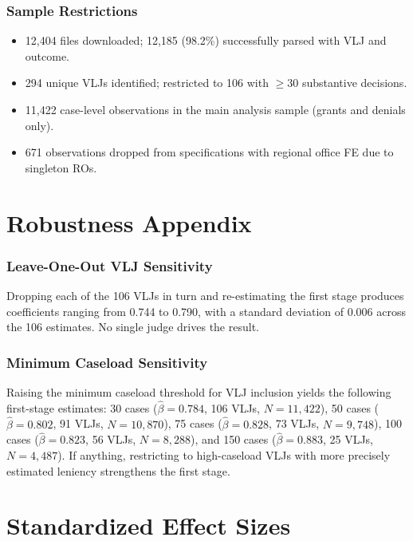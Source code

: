 \documentclass[12pt]{article}
\begin{document}
\subsubsection*{Sample Restrictions}
\begin{itemize}
\item 12,404 files downloaded; 12,185 (98.2\%) successfully parsed with VLJ and outcome.
\item 294 unique VLJs identified; restricted to 106 with $\geq 30$ substantive decisions.
\item 11,422 case-level observations in the main analysis sample (grants and denials only).
\item 671 observations dropped from specifications with regional office FE due to singleton ROs.
\end{itemize}

\section{Robustness Appendix}

\subsubsection*{Leave-One-Out VLJ Sensitivity} Dropping each of the 106 VLJs in turn and re-estimating the first stage produces coefficients ranging from 0.744 to 0.790, with a standard deviation of 0.006 across the 106 estimates. No single judge drives the result.

\subsubsection*{Minimum Caseload Sensitivity} Raising the minimum caseload threshold for VLJ inclusion yields the following first-stage estimates: 30 cases ($\hat{\beta} = 0.784$, 106 VLJs, $N = 11{,}422$), 50 cases ($\hat{\beta} = 0.802$, 91 VLJs, $N = 10{,}870$), 75 cases ($\hat{\beta} = 0.828$, 73 VLJs, $N = 9{,}748$), 100 cases ($\hat{\beta} = 0.823$, 56 VLJs, $N = 8{,}288$), and 150 cases ($\hat{\beta} = 0.883$, 25 VLJs, $N = 4{,}487$). If anything, restricting to high-caseload VLJs with more precisely estimated leniency strengthens the first stage.

\section{Standardized Effect Sizes}
\label{sec:sde}


\end{document}
